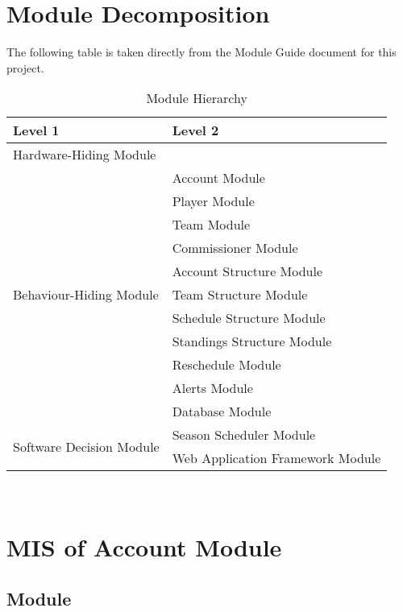 \documentclass[12pt, titlepage]{article}
\begin{document}
\section{Module Decomposition}

The following table is taken directly from the Module Guide document for this project.

\begin{table}[h!]
\centering
\begin{tabular}{p{} p{}}
\toprule
\textbf{Level 1} & \textbf{Level 2}\\
\midrule

{Hardware-Hiding Module} & ~ \\
\midrule

\multirow{11}{0.3\textwidth}{Behaviour-Hiding Module} & Account Module\\
& Player Module\\
& Team Module\\
& Commissioner Module\\
& Account Structure Module\\
& Team Structure Module\\
& Schedule Structure Module\\
& Standings Structure Module\\
& Reschedule Module\\
& Alerts Module\\
& Database Module\\
\midrule

\multirow{2}{0.3\textwidth}{Software Decision Module} & Season Scheduler
Module\\
& Web Application Framework Module\\
\bottomrule

\end{tabular}
\caption{Module Hierarchy}
\label{TblMH}
\end{table}

\newpage
~\newpage

\section{MIS of Account Module} \label{mAC}



\subsection{Module}
\end{document}
